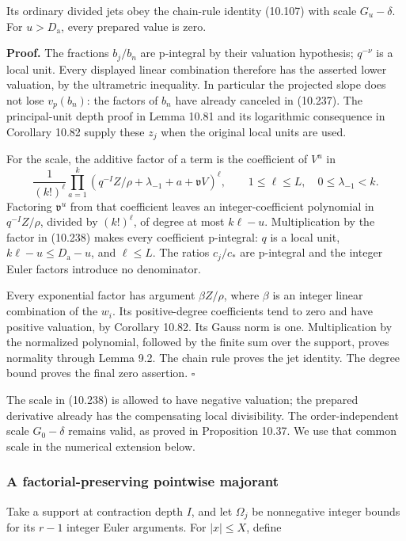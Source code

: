\documentclass[
  11pt,
  a4paper,
]{article}
\begin{document}
Its ordinary divided jets obey the chain-rule identity (10.107) with
scale \(G_u-\delta\). For \(u>D_{\mathrm a}\), every prepared value is
zero.

\textbf{Proof.} The fractions \(b_j/b_n\) are p-integral by their
valuation hypothesis; \(q^{-\nu}\) is a local unit. Every displayed
linear combination therefore has the asserted lower valuation, by the
ultrametric inequality. In particular the projected slope does not lose
\(v_p(b_n)\): the factors of \(b_n\) have already canceled in (10.237).
The principal-unit depth proof in Lemma 10.81 and its logarithmic
consequence in Corollary 10.82 supply these \(z_j\) when the original
local units are used.

For the scale, the additive factor of a term is the coefficient of
\(V^u\) in \[
\frac1{(k!)^\ell}
\prod_{a=1}^k(q^{-I}Z/\rho+\lambda_{-1}+a+\mathfrak v V)^\ell,
\qquad 1\le\ell\le L,\quad 0\le\lambda_{-1}<k.
\] Factoring \(\mathfrak v^u\) from that coefficient leaves an
integer-coefficient polynomial in \(q^{-I}Z/\rho\), divided by
\((k!)^\ell\), of degree at most \(k\ell-u\). Multiplication by the
factor in (10.238) makes every coefficient p-integral: \(q\) is a local
unit, \(k\ell-u\le D_{\mathrm a}-u\), and \(\ell\le L\). The ratios
\(c_j/c_*\) are p-integral and the integer Euler factors introduce no
denominator.

Every exponential factor has argument \(\beta Z/\rho\), where \(\beta\)
is an integer linear combination of the \(w_i\). Its positive-degree
coefficients tend to zero and have positive valuation, by Corollary
10.82. Its Gauss norm is one. Multiplication by the normalized
polynomial, followed by the finite sum over the support, proves
normality through Lemma 9.2. The chain rule proves the jet identity. The
degree bound proves the final zero assertion. \(\square\)

The scale in (10.238) is allowed to have negative valuation; the
prepared derivative already has the compensating local divisibility. The
order-independent scale \(G_0-\delta\) remains valid, as proved in
Proposition 10.37. We use that common scale in the numerical extension
below.

\subsubsection{A factorial-preserving pointwise
majorant}\label{a-factorial-preserving-pointwise-majorant}

Take a support at contraction depth \(I\), and let \(\Omega_j\) be
nonnegative integer bounds for its \(r-1\) integer Euler arguments. For
\(|x|\le X\), define
\end{document}
